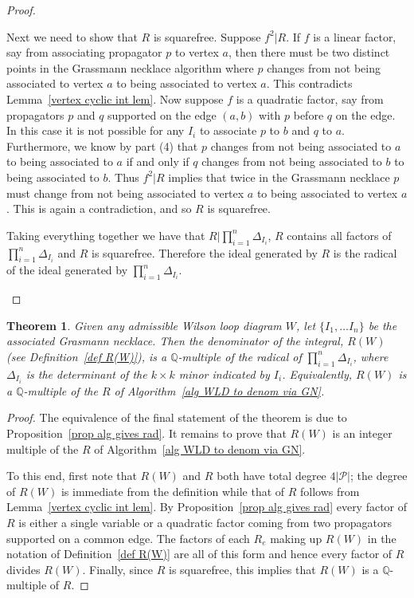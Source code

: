 \documentclass[11pt]{article}
\newtheorem{thm}{Theorem}[section]
\theoremstyle{remark}
\theoremstyle{definition}
\begin{document}
\begin{proof}
\begin{enumerate}
Next we need to show that $R$ is squarefree.  Suppose $f^2|R$.  If $f$ is a linear factor, say from associating propagator $p$ to vertex $a$, then there must be two distinct points in the Grassmann necklace algorithm where $p$ changes from not being associated to vertex $a$ to being associated to vertex $a$.  This contradicts Lemma~\ref{vertex cyclic int lem}.  Now suppose $f$ is a quadratic factor, say from propagators $p$ and $q$ supported on the edge $(a, b)$ with $p$ before $q$ on the edge.  In this case it is not possible for any $I_i$ to associate $p$ to $b$ and $q$ to $a$.  Furthermore, we know by part (4) that $p$ changes from not being associated to $a$ to being associated to $a$ if and only if $q$ changes from not being associated to $b$ to being associated to $b$.  Thus $f^2|R$ implies that twice in the Grassmann necklace $p$ must change from not being associated to vertex $a$ to being associated to vertex $a$. This is again a contradiction, and so $R$ is squarefree.

Taking everything together we have that $R|\prod_{i=1}^n \Delta_{I_i}$, $R$ contains all factors of $\prod_{i=1}^n \Delta_{I_i}$ and $R$ is squarefree.  Therefore the ideal generated by $R$ is the radical of the ideal generated by $\prod_{i=1}^n \Delta_{I_i}$.
  \end{enumerate}
\end{proof}


\begin{thm}\label{thm denom}
Given any admissible Wilson loop diagram $W$, let $\{I_1, \ldots I_n\}$ be the associated Grasmann necklace. Then the denominator of the integral, $R(W)$ (see Definition~\ref{def R(W)}), is a $\mathbb{Q}$-multiple of the radical of $\prod_{i=1}^n \Delta_{I_i}$, where $\Delta_{I_i}$ is the determinant of the $k \times k$ minor indicated by $I_i$.  Equivalently, $R(W)$ is a $\mathbb{Q}$-multiple of the $R$ of Algorithm~\ref{alg WLD to denom via GN}.
\end{thm}

\begin{proof}
The equivalence of the final statement of the theorem is due to Proposition~\ref{prop alg gives rad}.  It remains to prove that $R(W)$ is an integer multiple of the $R$ of Algorithm~\ref{alg WLD to denom via GN}.

To this end, first note that $R(W)$ and $R$ both have total degree $4|\mathcal{P}|$; the degree of $R(W)$ is immediate from the definition while that of $R$ follows from Lemma~\ref{vertex cyclic int lem}.  By Proposition~\ref{prop alg gives rad} every factor of $R$ is either a single variable or a quadratic factor coming from two propagators supported on a common edge.  The factors of each $R_e$ making up $R(W)$ in the notation of Definition~\ref{def R(W)} are all of this form and hence every factor of $R$ divides $R(W)$.
Finally, since $R$ is squarefree, this implies that $R(W)$ is a $\mathbb{Q}$-multiple of $R$.
\end{proof}
\end{document}
